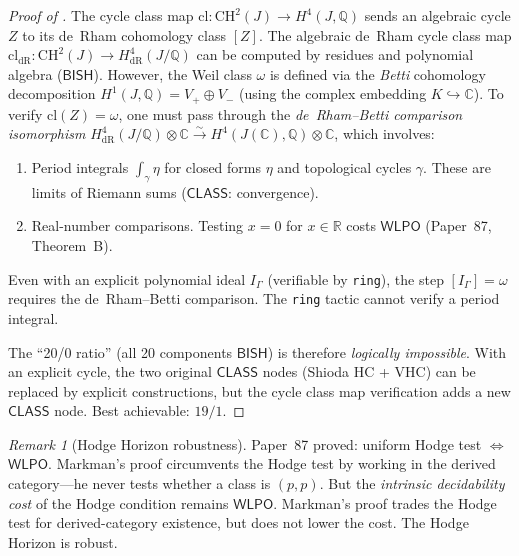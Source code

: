 \documentclass[11pt]{article}
\theoremstyle{plain}
\theoremstyle{definition}
\theoremstyle{remark}
\newtheorem{remark}[theorem]{Remark}
\newcommand{\QQ}{\mathbb{Q}}
\newcommand{\CC}{\mathbb{C}}
\newcommand{\RR}{\mathbb{R}}
\newcommand{\CH}{\mathrm{CH}}
\newcommand{\BISH}{\mathsf{BISH}}
\newcommand{\WLPO}{\mathsf{WLPO}}
\newcommand{\CLASS}{\mathsf{CLASS}}
\begin{document}
\begin{proof}[Proof of ]
The cycle class map $\mathrm{cl}: \CH^2(J) \to H^4(J, \QQ)$ sends
an algebraic cycle $Z$ to its de~Rham cohomology class $[Z]$.
The algebraic de~Rham cycle class map
$\mathrm{cl}_{\mathrm{dR}}: \CH^2(J) \to H^4_{\mathrm{dR}}(J/\QQ)$
can be computed by residues and polynomial algebra ($\BISH$).
However, the Weil class $\omega$ is defined via the \emph{Betti}
cohomology decomposition $H^1(J, \QQ) = V_+ \oplus V_-$ (using the
complex embedding $K \hookrightarrow \CC$).  To verify
$\mathrm{cl}(Z) = \omega$, one must pass through the
\emph{de~Rham--Betti comparison isomorphism}
$H^4_{\mathrm{dR}}(J/\QQ) \otimes \CC \xrightarrow{\sim}
H^4(J(\CC), \QQ) \otimes \CC$, which involves:
\begin{enumerate}[label=(\roman*),nosep]
\item Period integrals $\int_\gamma \eta$ for closed forms $\eta$
  and topological cycles $\gamma$.  These are limits of Riemann sums
  ($\CLASS$: convergence).
\item Real-number comparisons.  Testing $x = 0$ for $x \in \RR$ costs
  $\WLPO$ (Paper~87, Theorem~B).
\end{enumerate}
Even with an explicit polynomial ideal $I_\Gamma$ (verifiable by
\texttt{ring}), the step $[I_\Gamma] = \omega$ requires the
de~Rham--Betti comparison.  The \texttt{ring} tactic cannot verify a
period integral.

The ``20/0 ratio'' (all 20 components $\BISH$) is therefore
\emph{logically impossible}.  With an explicit cycle, the two
original $\CLASS$ nodes (Shioda HC + VHC) can be replaced by
explicit constructions, but the cycle class map verification adds a
new $\CLASS$ node.  Best achievable: $19/1$.
\end{proof}

\begin{remark}[Hodge Horizon robustness]
Paper~87 proved: uniform Hodge test $\Leftrightarrow$ $\WLPO$.
Markman's proof circumvents the Hodge test by working in the derived
category---he never tests whether a class is $(p,p)$.  But the
\emph{intrinsic decidability cost} of the Hodge condition remains
$\WLPO$.  Markman's proof trades the Hodge test for derived-category
existence, but does not lower the cost.  The Hodge Horizon is robust.
\end{remark}
\end{document}
